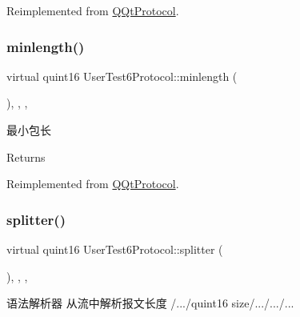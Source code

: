 Reimplemented from \mbox{\hyperlink{class_q_qt_protocol_af41bc3116abbbcfc9af45e151a253ff7}{Q\+Qt\+Protocol}}.

\mbox{\label{class_user_test6_protocol_aa70097712ded2d3947ad7fdcd116b6e3}} 
\subsubsection{\texorpdfstring{minlength()}{minlength()}}
{\footnotesize\ttfamily virtual quint16 User\+Test6\+Protocol\+::minlength (\begin{DoxyParamCaption}{ }\end{DoxyParamCaption})\hspace{0.3cm}{\ttfamily [inline]}, {\ttfamily [override]}, {\ttfamily [protected]}, {\ttfamily [virtual]}}



最小包长 

\begin{DoxyReturn}{Returns}

\end{DoxyReturn}


Reimplemented from \mbox{\hyperlink{class_q_qt_protocol_a2b00f53d3dd0eed817eeecff422891f3}{Q\+Qt\+Protocol}}.

\mbox{\label{class_user_test6_protocol_ac5ffc3b2d15b5d6d40148f589fae62cf}} 
\subsubsection{\texorpdfstring{splitter()}{splitter()}}
{\footnotesize\ttfamily virtual quint16 User\+Test6\+Protocol\+::splitter (\begin{DoxyParamCaption}\item[{const Q\+Byte\+Array \&}]{ }\end{DoxyParamCaption})\hspace{0.3cm}{\ttfamily [inline]}, {\ttfamily [override]}, {\ttfamily [protected]}, {\ttfamily [virtual]}}



语法解析器 从流中解析报文长度 /.../quint16 size/.../.../... 


